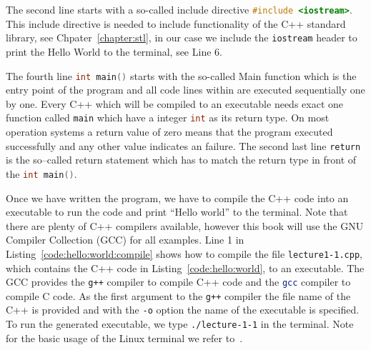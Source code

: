 The second line starts with a so-called include directive \lstinline[language=C++]{#include <iostream>}. This include directive is needed to include functionality of the C++ standard library, see Chpater~\ref{chapter:stl}, in our case we include the \lstinline|iostream| header to print the Hello World to the terminal, see Line 6.

The fourth line \lstinline[language=C++]{int main()} starts with the so-called Main function which is the entry point of the program and all code lines within are executed sequentially one by one. Every C++ which will be compiled to an executable needs exact one function called \lstinline[language=C++]|main| which have a integer \lstinline[language=C++]{int} as its return type. On most operation systems a return value of zero means that the program executed successfully and any other value indicates an failure. The second last line \lstinline[]|return| is the so--called return statement which has to match the return type in front of the \lstinline[language=C++]{int main()}.




Once we have written the program, we have to compile the C++ code into an executable to run the code and print ``Hello world'' to the terminal. Note that there are plenty of C++ compilers available, however this book will use the GNU Compiler Collection (GCC) for all examples. Line 1 in Listing~\ref{code:hello:world:compile} shows how to compile the file \lstinline[language=bash]|lecture1-1.cpp|, which contains the C++ code in Listing~\ref{code:hello:world}, to an executable. The GCC provides the \lstinline[language=bash]{g++} compiler to compile C++ code and the \lstinline[language=bash]{gcc} compiler to compile C code. As the first argument to the \lstinline[language=bash]{g++} compiler the file name of the C++ is provided and with the \lstinline[language=bash]|-o| option the name of the executable is specified. To run the generated executable, we type \lstinline[language=bash]|./lecture-1-1| in the terminal. Note for the basic usage of the Linux terminal we refer to~\cite{newham2005learning,robbins2016bash}.

